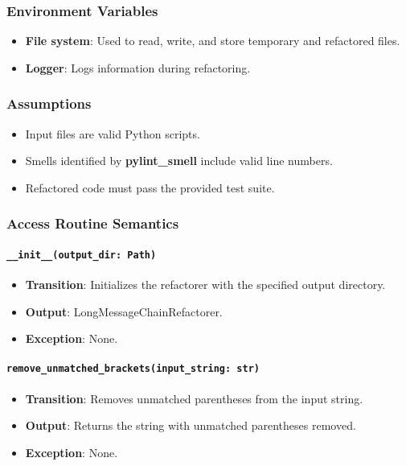 \documentclass[12pt, titlepage]{article}
\begin{document}
\subsubsection{Environment Variables}

\begin{itemize}
  \item \textbf{File system}: Used to read, write, and store temporary and refactored files.

  \item \textbf{Logger}: Logs information during refactoring.
  
\end{itemize}

\subsubsection{Assumptions}

\begin{itemize}
  \item Input files are valid Python scripts.
  \item Smells identified by \textbf{pylint\_smell} include valid line numbers.
  \item Refactored code must pass the provided test suite.
\end{itemize}
\subsubsection{Access Routine Semantics}

\paragraph{\texttt{\_\_init\_\_(output\_dir: Path)}}
\begin{itemize}
\item \textbf{Transition}: Initializes the refactorer with the specified output directory.
\item \textbf{Output}: LongMessageChainRefactorer.
\item \textbf{Exception}: None.
\end{itemize}

\paragraph{\texttt{remove\_unmatched\_brackets(input\_string: str)}}
\begin{itemize}
\item \textbf{Transition}: Removes unmatched parentheses from the input string.
\item \textbf{Output}: Returns the string with unmatched parentheses removed.
\item \textbf{Exception}: None.
\end{itemize}
\end{document}
